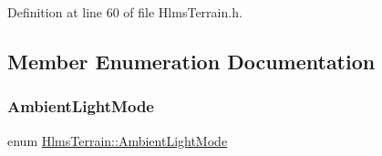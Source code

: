 Definition at line 60 of file Hlms\+Terrain.\+h.



\subsection{Member Enumeration Documentation}
\mbox{\label{class_hlms_terrain_a49e72052d5ccdc3b34459069c4496a49}} 
\subsubsection{\texorpdfstring{Ambient\+Light\+Mode}{AmbientLightMode}}
{\footnotesize\ttfamily enum \hyperlink{class_hlms_terrain_a49e72052d5ccdc3b34459069c4496a49}{Hlms\+Terrain\+::\+Ambient\+Light\+Mode}}

